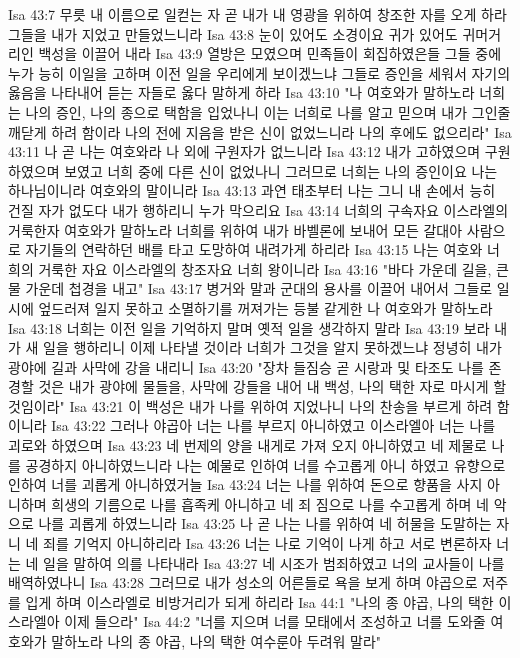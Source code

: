 Isa 43:7  무릇 내 이름으로 일컫는 자 곧 내가 내 영광을 위하여 창조한 자를 오게 하라 그들을 내가 지었고 만들었느니라
Isa 43:8  눈이 있어도 소경이요 귀가 있어도 귀머거리인 백성을 이끌어 내라
Isa 43:9  열방은 모였으며 민족들이 회집하였은들 그들 중에 누가 능히 이일을 고하며 이전 일을 우리에게 보이겠느냐 그들로 증인을 세워서 자기의 옳음을 나타내어 듣는 자들로 옳다 말하게 하라
Isa 43:10  "나 여호와가 말하노라 너희는 나의 증인, 나의 종으로 택함을 입었나니 이는 너희로 나를 알고 믿으며 내가 그인줄 깨닫게 하려 함이라 나의 전에 지음을 받은 신이 없었느니라 나의 후에도 없으리라"
Isa 43:11  나 곧 나는 여호와라 나 외에 구원자가 없느니라
Isa 43:12  내가 고하였으며 구원하였으며 보였고 너희 중에 다른 신이 없었나니 그러므로 너희는 나의 증인이요 나는 하나님이니라 여호와의 말이니라
Isa 43:13  과연 태초부터 나는 그니 내 손에서 능히 건질 자가 없도다 내가 행하리니 누가 막으리요
Isa 43:14  너희의 구속자요 이스라엘의 거룩한자 여호와가 말하노라 너희를 위하여 내가 바벨론에 보내어 모든 갈대아 사람으로 자기들의 연락하던 배를 타고 도망하여 내려가게 하리라
Isa 43:15  나는 여호와 너희의 거룩한 자요 이스라엘의 창조자요 너희 왕이니라
Isa 43:16  "바다 가운데 길을, 큰 물 가운데 첩경을 내고"
Isa 43:17  병거와 말과 군대의 용사를 이끌어 내어서 그들로 일시에 엎드러져 일지 못하고 소멸하기를 꺼져가는 등불 같게한 나 여호와가 말하노라
Isa 43:18  너희는 이전 일을 기억하지 말며 옛적 일을 생각하지 말라
Isa 43:19  보라 내가 새 일을 행하리니 이제 나타낼 것이라 너희가 그것을 알지 못하겠느냐 정녕히 내가 광야에 길과 사막에 강을 내리니
Isa 43:20  "장차 들짐승 곧 시랑과 및 타조도 나를 존경할 것은 내가 광야에 물들을, 사막에 강들을 내어 내 백성, 나의 택한 자로 마시게 할 것임이라"
Isa 43:21  이 백성은 내가 나를 위하여 지었나니 나의 찬송을 부르게 하려 함이니라
Isa 43:22  그러나 야곱아 너는 나를 부르지 아니하였고 이스라엘아 너는 나를 괴로와 하였으며
Isa 43:23  네 번제의 양을 내게로 가져 오지 아니하였고 네 제물로 나를 공경하지 아니하였느니라 나는 예물로 인하여 너를 수고롭게 아니 하였고 유향으로 인하여 너를 괴롭게 아니하였거늘
Isa 43:24  너는 나를 위하여 돈으로 향품을 사지 아니하며 희생의 기름으로 나를 흡족케 아니하고 네 죄 짐으로 나를 수고롭게 하며 네 악으로 나를 괴롭게 하였느니라
Isa 43:25  나 곧 나는 나를 위하여 네 허물을 도말하는 자니 네 죄를 기억지 아니하리라
Isa 43:26  너는 나로 기억이 나게 하고 서로 변론하자 너는 네 일을 말하여 의를 나타내라
Isa 43:27  네 시조가 범죄하였고 너의 교사들이 나를 배역하였나니
Isa 43:28  그러므로 내가 성소의 어른들로 욕을 보게 하며 야곱으로 저주를 입게 하며 이스라엘로 비방거리가 되게 하리라
Isa 44:1  "나의 종 야곱, 나의 택한 이스라엘아 이제 들으라"
Isa 44:2  "너를 지으며 너를 모태에서 조성하고 너를 도와줄 여호와가 말하노라 나의 종 야곱, 나의 택한 여수룬아 두려워 말라"
